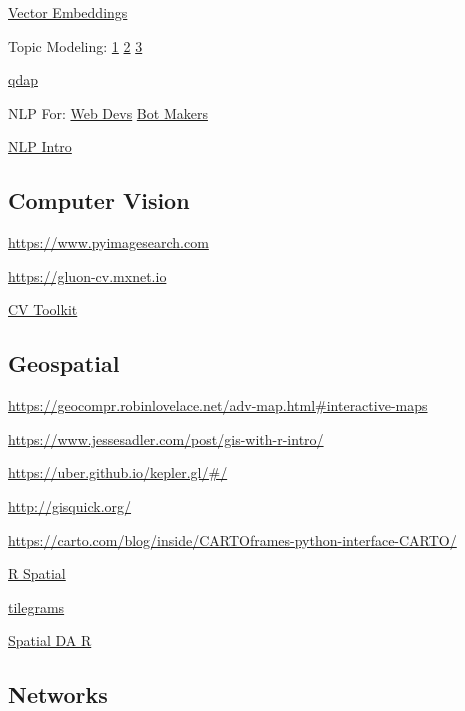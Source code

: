\documentclass[]{book}
\begin{document}
\href{http://bookworm.benschmidt.org/posts/2015-10-25-Word-Embeddings.html}{Vector
Embeddings}

Topic Modeling:
\href{http://alexperrier.github.io/jekyll/update/2015/09/04/topic-modeling-of-twitter-followers.html}{1}
\textbar{}
\href{http://chdoig.github.io/pytexas2015-topic-modeling/\#/}{2}
\textbar{}
\href{https://www.cs.princeton.edu/~blei/topicmodeling.html}{3}

\href{https://trinker.github.io/qdap/vignettes/qdap_vignette.html}{qdap}

NLP For:
\href{http://blog.algorithmia.com/natural-language-processing-algorithms-web-developers/}{Web
Devs} \textbar{}
\href{https://stanfy.com/blog/advanced-natural-language-processing-tools-for-bot-makers/}{Bot
Makers}

\href{http://blog.algorithmia.com/introduction-natural-language-processing-nlp/}{NLP
Intro}

\subsection{Computer Vision}\label{computer-vision}

\url{https://www.pyimagesearch.com}

\url{https://gluon-cv.mxnet.io}

\href{https://luminoth.ai}{CV Toolkit}

\subsection{Geospatial}\label{geospatial}

\url{https://geocompr.robinlovelace.net/adv-map.html\#interactive-maps}

\url{https://www.jessesadler.com/post/gis-with-r-intro/}

\url{https://uber.github.io/kepler.gl/\#/}

\url{http://gisquick.org/}

\url{https://carto.com/blog/inside/CARTOframes-python-interface-CARTO/}

\href{http://www.rspatial.org/analysis/rst/2-scale_distance.html}{R
Spatial}

\href{https://pitchinteractiveinc.github.io/tilegrams/}{tilegrams}

\href{https://data.cdrc.ac.uk/tutorial/an-introduction-to-spatial-data-analysis-and-visualisation-in-r}{Spatial
DA R}

\subsection{Networks}\label{networks}
\end{document}
